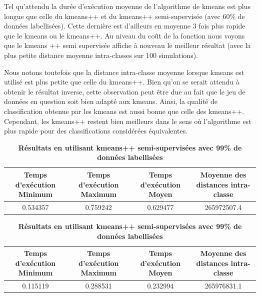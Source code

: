 \documentclass[12pt,a4paper]{book}
\newcommand{\1}{\mathds{1}}
\begin{document}
\vspace{20 mm}

\noindent 
Tel qu'attendu la durée d'exécution moyenne de l'algorithme de kmeans est plus longue que celle du kmeans++ et du kmeans++ semi-supervisée (avec 60\% de données labellisées). Cette dernière est d'ailleurs en moyenne 3 fois plus rapide que le kmeans ou le kmeans++. Au niveau du coût de la fonction nous voyons que le kmeans ++ semi supervisée affiche à nouveau le meilleur résultat (avec la plus petite distance moyenne intra-classes sur 100 simulations). 

\vspace{5 mm}
\noindent 
Nous notons toutefois que la distance intra-classe moyenne lorsque kmeans est utilisé est plus petite que celle du kmeans++.  Bien qu'on se serait attendu à obtenir le résultat inverse, cette observation peut être due au fait que le jeu de données en question soit bien adapté aux kmeans. Ainsi, la qualité de classification obtenue par les kmeans est aussi bonne que celle des kmeans++. Cependant, les kmeans++ restent bien meilleurs dans le sens où l'algorithme est plus rapide pour des classifications considérées équivalentes.


\vspace{10mm}


\begin{table}[ht]
\footnotesize

\caption{\textbf{Résultats en utilisant kmeans++ semi-supervisées avec 25\% de données labellisées}} 

\begin{adjustbox}{width=\columnwidth,center}
\begin{tabular}{c|c|c|c}
\hline
\rowcolor{Gray}
Temps d'exécution Minimum & Temps d'exécution Maximum & Temps d'exécution Moyen & Moyenne des distances intra-classe \\
\hline
0.534357&0.759242& 0.629477& \cellcolor{LightCyan}265972507.4\\

\end{tabular}
\end{adjustbox}


\vspace{10 mm}
\caption{\textbf{Résultats en utilisant kmeans++ semi-supervisées avec 99\% de données labellisées}} 

\begin{adjustbox}{width=\columnwidth,center}
\begin{tabular}{c|c|c|c}
\hline
\rowcolor{Gray}
Temps d'exécution Minimum & Temps d'exécution Maximum & Temps d'exécution Moyen & Moyenne des distances intra-classe \\
\hline
0.115119&0.288531& 0.232994& \cellcolor{LightCyan}265976831.1\\
\end{tabular}
\end{adjustbox}

\end{table}
\end{document}
